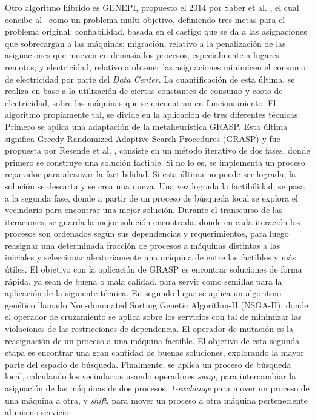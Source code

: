 Otro algoritmo híbrido es GENEPI, propuesto el 2014 por Saber et al. \cite{saber2014genepi}, el cual concibe al \mrp\ como un problema multi-objetivo, definiendo tres metas para el problema original: confiabilidad, basada en el castigo que se da a las asignaciones que sobrecargan a las máquinas; migración, relativo a la penalización de las asignaciones que mueven en demasía los procesos, especialmente a lugares remotos; y electricidad, relativo a obtener las asignaciones minimicen el consumo de electricidad por parte del \textit{Data Center}. La cuantificación de esta última, se realiza en base a la utilización de ciertas constantes de consumo y costo de electricidad, sobre las máquinas que se encuentran en funcionamiento. El algoritmo propiamente tal, se divide en la aplicación de tres diferentes técnicas. Primero se aplica una adaptación de la metaheurística GRASP. Esta última significa  Greedy Randomized Adaptive Search Procedures (GRASP) y fue propuesta por Resende et al. \cite{resende1995grasp}, consiste en un método iterativo de dos fases, donde primero se construye una solución factible. Si no lo es, se implementa un proceso reparador para alcanzar la factibilidad. Si esta última no puede ser lograda, la solución se descarta y se crea una nueva. Una vez lograda la factibilidad, se pasa a la segunda fase, donde a partir de un proceso de búsqueda local se explora el vecindario para encontrar una mejor solución. Durante el transcurso de las iteraciones, se guarda la mejor solución encontrada. donde en cada iteración los procesos son ordenados según sus dependencias y requerimientos, para luego reasignar una determinada fracción de procesos a máquinas distintas a las iniciales y seleccionar aleatoriamente una máquina de entre las factibles y más útiles. El objetivo con la aplicación de GRASP es encontrar soluciones de forma rápida, ya sean de buena o mala calidad, para servir como semillas para la aplicación de la siguiente técnica. En segundo lugar se aplica un algoritmo genético llamado Non-dominated Sorting Genetic Algorithm-II (NSGA-II), donde el operador de cruzamiento se aplica sobre los servicios con tal de minimizar las violaciones de las restricciones de dependencia. El operador de mutación es la reasignación de un proceso a una máquina factible. El objetivo de esta segunda etapa es encontrar una gran cantidad de buenas soluciones, explorando la mayor parte del espacio de búsqueda. Finalmente, se aplica un proceso de búsqueda local, calculando los vecindarios usando operadores \textit{swap}, para intercambiar la asignación de las máquinas de dos procesos, \textit{1-exchange} para mover un proceso de una máquina a otra, y \textit{shift}, para mover un proceso a otra máquina perteneciente al mismo servicio.

